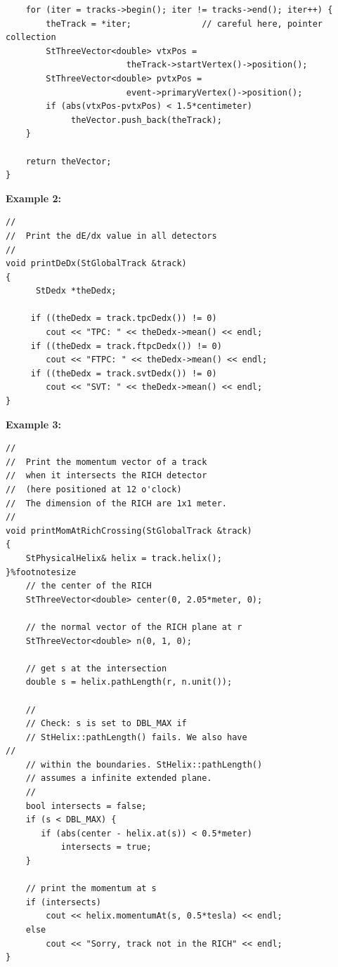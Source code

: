 \begin{enumerate}
\begin{Entry}
{\begin{verbatim}
    for (iter = tracks->begin(); iter != tracks->end(); iter++) {
        theTrack = *iter;              // careful here, pointer collection
        StThreeVector<double> vtxPos =
                        theTrack->startVertex()->position();
        StThreeVector<double> pvtxPos =
                        event->primaryVertex()->position();
        if (abs(vtxPos-pvtxPos) < 1.5*centimeter)
             theVector.push_back(theTrack);
    }

    return theVector;
}
\end{verbatim}
}%

{\bf Example 2:}
{\footnotesize
\begin{verbatim}
//
//  Print the dE/dx value in all detectors
//
void printDeDx(StGlobalTrack &track)
{
      StDedx *theDedx;

     if ((theDedx = track.tpcDedx()) != 0)
        cout << "TPC: " << theDedx->mean() << endl;
     if ((theDedx = track.ftpcDedx()) != 0)
        cout << "FTPC: " << theDedx->mean() << endl;
     if ((theDedx = track.svtDedx()) != 0)
        cout << "SVT: " << theDedx->mean() << endl;
}
\end{verbatim}
}%

{\bf Example 3:}
{\footnotesize
\begin{verbatim}
//
//  Print the momentum vector of a track
//  when it intersects the RICH detector
//  (here positioned at 12 o'clock)
//  The dimension of the RICH are 1x1 meter.
//
void printMomAtRichCrossing(StGlobalTrack &track)
{
    StPhysicalHelix& helix = track.helix();
}%footnotesize   
    // the center of the RICH
    StThreeVector<double> center(0, 2.05*meter, 0);

    // the normal vector of the RICH plane at r
    StThreeVector<double> n(0, 1, 0);

    // get s at the intersection
    double s = helix.pathLength(r, n.unit());

    //
    // Check: s is set to DBL_MAX if
    // StHelix::pathLength() fails. We also have
//  
    // within the boundaries. StHelix::pathLength()
    // assumes a infinite extended plane.
    //
    bool intersects = false;
    if (s < DBL_MAX) {
       if (abs(center - helix.at(s)) < 0.5*meter)
           intersects = true;
    }

    // print the momentum at s
    if (intersects)
        cout << helix.momentumAt(s, 0.5*tesla) << endl;
    else
        cout << "Sorry, track not in the RICH" << endl;
}
\end{verbatim}
}%


\end{Entry}
\end{enumerate}
